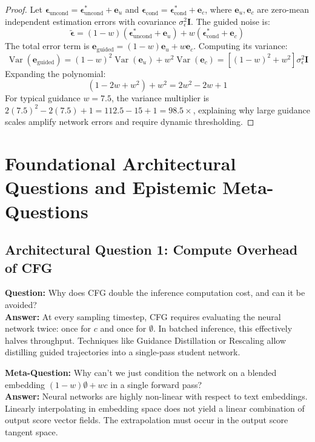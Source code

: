 \documentclass[11pt,a4paper]{article}
\theoremstyle{definition}
\begin{document}
\begin{proof}
Let $\boldsymbol{\epsilon}_{\text{uncond}} = \boldsymbol{\epsilon}^*_{\text{uncond}} + \mathbf{e}_u$ and $\boldsymbol{\epsilon}_{\text{cond}} = \boldsymbol{\epsilon}^*_{\text{cond}} + \mathbf{e}_c$, where $\mathbf{e}_u, \mathbf{e}_c$ are zero-mean independent estimation errors with covariance $\sigma_\epsilon^2 \mathbf{I}$.
The guided noise is:
{\boldmath
\begin{equation}
\tilde{\boldsymbol{\epsilon}} = (1 - w)(\boldsymbol{\epsilon}^*_{\text{uncond}} + \mathbf{e}_u) + w(\boldsymbol{\epsilon}^*_{\text{cond}} + \mathbf{e}_c)
\end{equation}
}
The total error term is $\mathbf{e}_{\text{guided}} = (1 - w)\mathbf{e}_u + w\mathbf{e}_c$.
Computing its variance:
{\boldmath
\begin{equation}
\operatorname{Var}(\mathbf{e}_{\text{guided}}) = (1 - w)^2 \operatorname{Var}(\mathbf{e}_u) + w^2 \operatorname{Var}(\mathbf{e}_c) = \left[ (1 - w)^2 + w^2 \right] \sigma_\epsilon^2 \mathbf{I}
\end{equation}
}
Expanding the polynomial:
{\boldmath
\begin{equation}
(1 - 2w + w^2) + w^2 = 2w^2 - 2w + 1
\end{equation}
}
For typical guidance $w = 7.5$, the variance multiplier is $2(7.5)^2 - 2(7.5) + 1 = 112.5 - 15 + 1 = 98.5\times$, explaining why large guidance scales amplify network errors and require dynamic thresholding.
\end{proof}

\section{Foundational Architectural Questions and Epistemic Meta-Questions}

\subsection{Architectural Question 1: Compute Overhead of CFG}
\textbf{Question:} Why does CFG double the inference computation cost, and can it be avoided?\\
\textbf{Answer:} At every sampling timestep, CFG requires evaluating the neural network twice: once for $c$ and once for $\emptyset$. In batched inference, this effectively halves throughput. Techniques like Guidance Distillation or Rescaling allow distilling guided trajectories into a single-pass student network.

\textbf{Meta-Question:} Why can't we just condition the network on a blended embedding $(1-w)\emptyset + w c$ in a single forward pass?\\
\textbf{Answer:} Neural networks are highly non-linear with respect to text embeddings. Linearly interpolating in embedding space does not yield a linear combination of output score vector fields. The extrapolation must occur in the output score tangent space.
\end{document}
